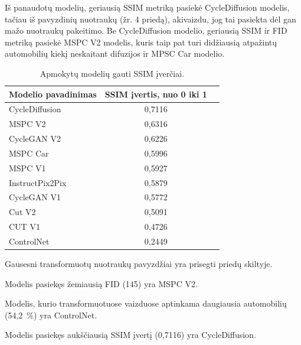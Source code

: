 \documentclass{VUMIFPSbakalaurinis}
\begin{document}
            Iš panaudotų modelių, geriausią SSIM metriką pasiekė CycleDiffusion modelis, tačiau iš pavyzdinių nuotraukų (žr. 4 priedą), akivaizdu, jog tai pasiekta dėl gan mažo nuotraukų pakeitimo. Be CycleDiffusion modelio, geriausią SSIM ir FID metriką pasiekė MSPC V2 modelis, kuris taip pat turi didžiausią atpažintų automobilių kiekį neskaitant difuzijos ir MPSC Car modelio.

        
            \begin{table}[H]
                \footnotesize
                \centering
                \caption{Apmokytų modelių gauti SSIM įverčiai.}
                {\begin{tabular}{|l|c|c|} \hline
                    Modelio pavadinimas & SSIM įvertis, nuo 0 iki 1\\
                    \hline
                    CycleDiffusion & 0,7116 \\ %
                    MSPC V2 & 0,6316 \\
                    CycleGAN V2 & 0,6226 \\
                    MSPC Car & 0,5996 \\ %
                    MSPC V1 & 0,5927 \\
                    InstructPix2Pix & 0,5879 \\ %
                    CycleGAN V1 & 0,5772 \\
                    Cut V2 & 0,5091\\ 
                    CUT V1 & 0,4726 \\
                    ControlNet & 0,2449 \\ %
                    \hline
                    \end{tabular}
                }
                \label{tab:table example}
            \end{table}
    
Gausesni transformuotų nuotraukų pavyzdžiai yra prisegti priedų skiltyje.

Modelis pasiekęs žemiausią FID (145) yra MSPC V2. 

Modelis, kurio transformuotuose vaizduose aptinkama daugiausia automobilių (54,2~\%) yra ControlNet.

Modelis pasiekęs aukščiausią SSIM įvertį (0,7116) yra CycleDiffusion.
\end{document}

